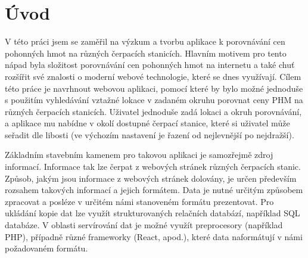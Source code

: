 \chapter{Úvod}
\label{sec:Introduction}
V této práci jsem se zaměřil na výzkum a tvorbu aplikace k porovnávání cen
pohonných hmot na různých čerpacích stanicích. Hlavním motivem pro tento
nápad byla složitost porovnávání cen pohonných hmot na internetu a také chuť
rozšířit své znalosti o moderní webové technologie, které se dnes využívají.
Cílem této práce je navrhnout webovou aplikaci, pomocí které by bylo možné
jednoduše s použitím vyhledávání vztažné lokace v zadaném okruhu porovnat
ceny PHM na různých čerpacích stanicích. Uživatel jednoduše zadá lokaci
a okruh porovnávání, a aplikace mu nabídne v okolí dostupné čerpací stanice,
které si uživatel může seřadit dle libosti (ve výchozím nastavení je řazení
od nejlevnější po nejdražší).

Základním stavebním kamenem pro takovou aplikaci je samozřejmě zdroj 
informací. Informace tak lze čerpat z webových stránek různých čerpacích
stanic. Způsob, jakým jsou informace z webových stránek dolovány, je určen
především rozsahem takových informací a jejich formátem. Data je nutné
určitým způsobem zpracovat a posléze v určitém námi stanoveném formátu
prezentovat. Pro ukládání kopie dat lze využít strukturovaných relačních
databází, například SQL databáze. V oblasti servírování dat je možné využít
preprocesory (například PHP), případně různé frameworky (React, apod.),
které data naformátují v námi požadovaném formátu.

\endinput
